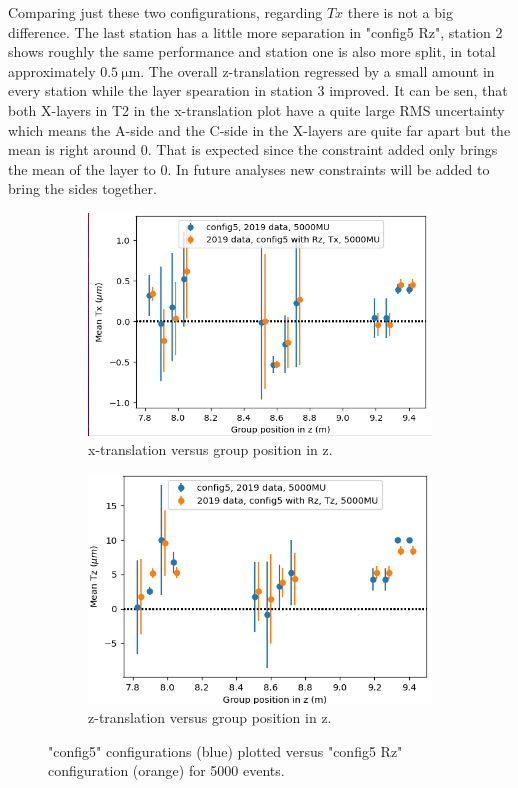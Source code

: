 Comparing just these two configurations, regarding $Tx$ there is not a big difference.
The last station has a little more separation in "config5 Rz", station 2 shows roughly the same performance and station one is also more split, in total approximately
$\SI{0.5}{\micro\metre}$. The overall z-translation regressed by a small amount in every station while the layer spearation in station 3 improved.
It can be sen, that both X-layers in T2 in the x-translation plot have a quite large RMS uncertainty which means the A-side and the C-side in the X-layers are quite far apart but the mean is right around 0. That is expected since the constraint added only brings the mean of the layer to 0. In future analyses new constraints will be added to bring the sides together.
\begin{figure}
  \centering
  \begin{subfigure}[b]{0.4\textwidth}
    \centering
    \includegraphics[width=\textwidth]{plots/renewed_plots/Tx.png}
    \caption{x-translation versus group position in z.}
    \label{fig:config5_Tx}
  \end{subfigure}
  \hfill
  \begin{subfigure}[b]{0.4\textwidth}
    \centering
    \includegraphics[width=\textwidth]{plots/renewed_plots/Tz.png}
    \caption{z-translation versus group position in z.}
    \label{fig:config5_Tz}
  \end{subfigure}
  \caption{"config5" configurations (blue) plotted versus "config5 Rz" configuration (orange) for 5000 events.}
  \label{fig:config5_tra}
\end{figure}

